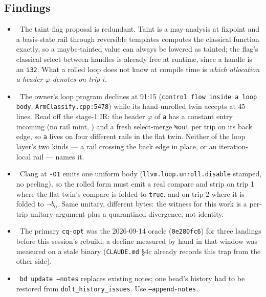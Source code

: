 \subsection*{Findings}
\begin{itemize}
  \item \fdoc\ The taint-flag proposal is redundant. Taint is a may-analysis at fixpoint and
        a basis-state rail through reversible templates computes the classical function
        exactly, so a maybe-tainted value can always be lowered as tainted; the flag's
        classical select between handles is already free at runtime, since a handle is an
        \texttt{i32}. What a rolled loop does not know at compile time is \emph{which
        allocation a header $\varphi$ denotes on trip $i$}.
  \item \foverdecline\ The owner's loop program declines at 91:15 (\texttt{control flow
        inside a loop body}, \texttt{ArmClassify.cpp:5478}) while its hand-unrolled twin
        accepts at 45 lines. Read off the stage-1 IR: the header $\varphi$ of \texttt{a}
        has a constant entry incoming (no rail mint, ) and a fresh select-merge
        \texttt{\%out} per trip on its back edge, so \texttt{a} lives on four different
        rails in the flat twin. Neither of the loop layer's two kinds --- a rail crossing
        the back edge in place, or an iteration-local rail --- names it.
  \item \fdoc\ Clang at \texttt{-O1} emits one uniform body (\texttt{llvm.loop.unroll.disable}
        stamped, no peeling), so the rolled form must emit a real compare and strip on trip 1
        where the flat twin's compare is folded to \texttt{true}, and on trip 2 where it is
        folded to $\neg b_0$. Same unitary, different bytes: the witness for this work is a
        per-trip unitary argument plus a quarantined divergence, not identity.
  \item \fconfirmed\ The primary \texttt{cq-opt} was the 2026-09-14 oracle
        (\texttt{0e280fc6}) for three landings before this session's rebuild; a decline
        measured by hand in that window was measured on a stale binary
        (\texttt{CLAUDE.md} \S4c already records this trap from the other side).
  \item \fdoc\ \texttt{bd update --notes} replaces existing notes; one bead's history had to
        be restored from \texttt{dolt\_history\_issues}. Use \texttt{--append-notes}.
\end{itemize}

